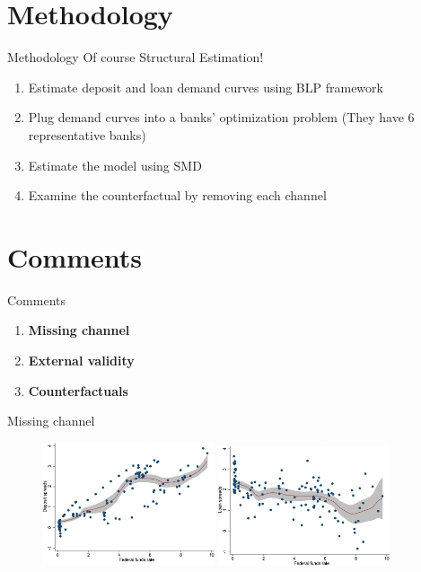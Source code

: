 \documentclass{beamer}
\begin{document}
    


\section{Methodology}

\begin{frame}{Methodology}
    Of course Structural Estimation!\\
    \vspace{0.5cm}
    \begin{enumerate}
        \item Estimate deposit and loan demand curves using BLP framework \citep{BLP1995}
        \item Plug demand curves into a banks' optimization problem (They have 6 representative banks)
        \item Estimate the model using SMD
        \item Examine the counterfactual by removing each channel
    \end{enumerate}
\end{frame}

\section{Comments}
\begin{frame}{Comments}
    \begin{enumerate}
        \item \textbf{Missing channel} 
        \item \textbf{External validity}
        \item \textbf{Counterfactuals} 
    \end{enumerate}    
\end{frame}
\begin{frame}{Missing channel}
\begin{figure}[htbp]
    \centering
    \includegraphics[width=0.45\textwidth]{Figure1a.jpg}
    \includegraphics[width=0.45\textwidth]{Figure1b.jpg}
\end{figure}
\end{frame}
\end{document}
